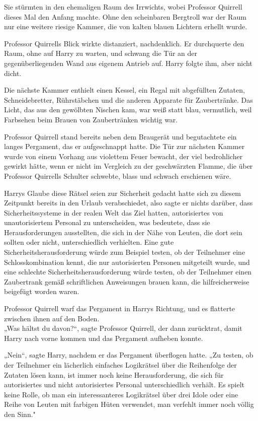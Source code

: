 {Sie stürmten in den ehemaligen Raum des Irrwichts, wobei Professor Quirrell dieses Mal den Anfang machte. Ohne den scheinbaren Bergtroll war der Raum nur eine weitere riesige Kammer, die von kalten blauen Lichtern erhellt wurde.

Professor Quirrells Blick wirkte distanziert, nachdenklich. Er durchquerte den Raum, ohne auf Harry zu warten, und schwang die Tür an der gegenüberliegenden Wand aus eigenem Antrieb auf. Harry folgte ihm, aber nicht dicht.

Die nächste Kammer enthielt einen Kessel, ein Regal mit abgefüllten Zutaten, Schneidebretter, Rührstäbchen und die anderen Apparate für Zaubertränke. Das Licht, das aus den gewölbten Nischen kam, war weiß statt blau, vermutlich, weil Farbsehen beim Brauen von Zaubertränken wichtig war.

Professor Quirrell stand bereits neben dem Braugerät und begutachtete ein langes Pergament, das er aufgeschnappt hatte. Die Tür zur nächsten Kammer wurde von einem Vorhang aus violettem Feuer bewacht, der viel bedrohlicher gewirkt hätte, wenn er nicht im Vergleich zu der geschwärzten Flamme, die über Professor Quirrells Schulter schwebte, blass und schwach erschienen wäre.

Harrys Glaube diese Rätsel seien zur Sicherheit gedacht hatte sich zu diesem Zeitpunkt bereits in den Urlaub verabschiedet, also sagte er nichts darüber, dass Sicherheitssysteme in der realen Welt das Ziel hatten, autorisiertes von unautorisiertem Personal zu unterscheiden, was bedeutete, dass sie Herausforderungen ausstellten, die sich in der Nähe von Leuten, die dort sein sollten oder nicht, unterschiedlich verhielten. Eine gute Sicherheitsherausforderung würde zum Beispiel testen, ob der Teilnehmer eine Schlosskombination kennt, die nur autorisierten Personen mitgeteilt wurde, und eine schlechte Sicherheitsherausforderung würde testen, ob der Teilnehmer einen Zaubertrank gemäß schriftlichen Anweisungen brauen kann, die hilfreicherweise beigefügt worden waren.

Professor Quirrell warf das Pergament in Harrys Richtung, und es flatterte zwischen ihnen auf den Boden.\\ „Was hältst du davon?“, sagte Professor Quirrell, der dann zurücktrat, damit Harry nach vorne kommen und das Pergament aufheben konnte.

„Nein“, sagte Harry, nachdem er das Pergament überflogen hatte. „Zu testen, ob der Teilnehmer ein lächerlich einfaches Logikrätsel über die Reihenfolge der Zutaten lösen kann, ist immer noch keine Herausforderung, die sich für autorisiertes und nicht autorisiertes Personal unterschiedlich verhält. Es spielt keine Rolle, ob man ein interessanteres Logikrätsel über drei Idole oder eine Reihe von Leuten mit farbigen Hüten verwendet, man verfehlt immer noch völlig den Sinn."

}
